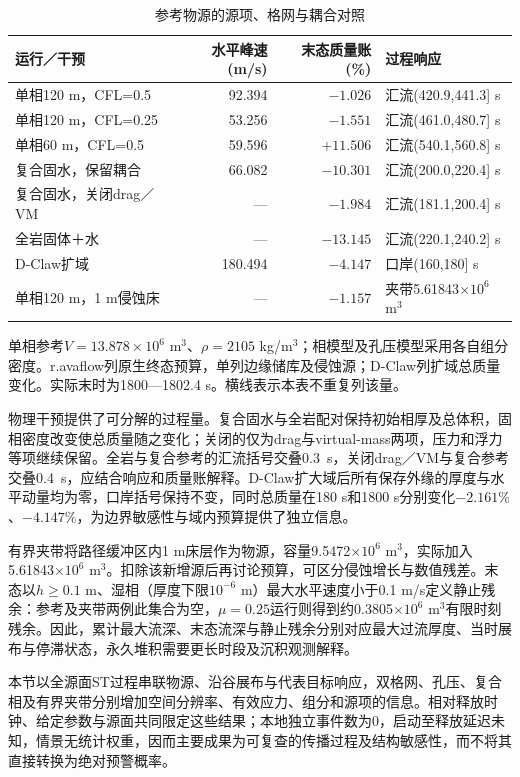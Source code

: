 \begin{table}[htbp]
\centering\small
\caption{参考物源的源项、格网与耦合对照}\label{q4-tab-numerics}
\begin{tabularx}{\linewidth}{lrrY}
\toprule
运行／干预 & 水平峰速(m/s)&末态质量账(\%)&过程响应\\
\midrule
单相120 m，CFL=0.5 &92.394&$-1.026$&汇流(420.9,441.3] s\\
单相120 m，CFL=0.25&53.256&$-1.551$&汇流(461.0,480.7] s\\
单相60 m，CFL=0.5&59.596&$+11.506$&汇流(540.1,560.8] s\\
复合固水，保留耦合&66.082&$-10.301$&汇流(200.0,220.4] s\\
复合固水，关闭drag／VM&---&$-1.984$&汇流(181.1,200.4] s\\
全岩固体＋水&---&$-13.145$&汇流(220.1,240.2] s\\
D-Claw扩域&180.494&$-4.147$&口岸(160,180] s\\
单相120 m，1 m侵蚀床&---&$-1.157$&夹带5.61843$\times10^6$ m$^3$\\
\bottomrule
\end{tabularx}
\par\raggedright\footnotesize 单相参考$V=13.878\times10^6$ m$^3$、$\rho=2105$ kg/m$^3$；相模型及孔压模型采用各自组分密度。r.avaflow列原生终态预算，单列边缘储库及侵蚀源；D-Claw列扩域总质量变化。实际末时为1800—1802.4 s。横线表示本表不重复列该量。
\end{table}

物理干预提供了可分解的过程量。复合固水与全岩配对保持初始相厚及总体积，固相密度改变使总质量随之变化；关闭的仅为drag与virtual-mass两项，压力和浮力等项继续保留。全岩与复合参考的汇流括号交叠0.3~s，关闭drag／VM与复合参考交叠0.4~s，应结合响应和质量账解释。D-Claw扩大域后所有保存外缘的厚度与水平动量均为零，口岸括号保持不变，同时总质量在180 s和1800 s分别变化$-2.161\%$、$-4.147\%$，为边界敏感性与域内预算提供了独立信息。

有界夹带将路径缓冲区内1 m床层作为物源，容量9.5472$\times10^6$ m$^3$，实际加入5.61843$\times10^6$ m$^3$。扣除该新增源后再讨论预算，可区分侵蚀增长与数值残差。末态以$h\geq0.1$ m、湿相（厚度下限$10^{-6}$ m）最大水平速度小于0.1 m/s定义静止残余：参考及夹带两例此集合为空，$\mu=0.25$运行则得到约0.3805$\times10^6$ m$^3$有限时刻残余。因此，累计最大流深、末态流深与静止残余分别对应最大过流厚度、当时展布与停滞状态，永久堆积需要更长时段及沉积观测解释。

本节以全源面ST过程串联物源、沿谷展布与代表目标响应，双格网、孔压、复合相及有界夹带分别增加空间分辨率、有效应力、组分和源项的信息。相对释放时钟、给定参数与源面共同限定这些结果；本地独立事件数为0，启动至释放延迟未知，情景无统计权重，因而主要成果为可复查的传播过程及结构敏感性，而不将其直接转换为绝对预警概率。

\AIcredit
\FloatBarrier
